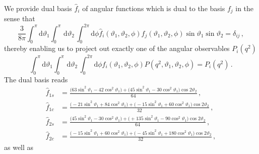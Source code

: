 \documentclass[aps,prd,reprint,nofootinbib,preprintnumbers]{revtex4}
\newcommand{\dd}{\text{d}}
\renewcommand{\theta}{\vartheta}
\begin{document}
We provide dual basis $\hat{f}_i$ of angular functions which is dual to the basis $f_j$ in the sense that
\begin{equation}
    \frac{3}{8\pi}\int_0^\pi \dd\theta_1 \int_0^\pi\,\dd\theta_2\, \int_0^{2\pi}\dd \phi \hat{f}_i(\theta_1,\theta_2,\phi) f_j(\theta_1,\theta_2,\phi) \sin\theta_1 \sin\theta_2 = \delta_{ij}\,,
\end{equation}
thereby enabling us to project out exactly one of the angular
observables $P_i(q^2)$
\begin{equation}
    \int_0^\pi \dd\theta_1 \int_0^\pi\,\dd\theta_2\, \int_0^{2\pi}\dd \phi \hat{f}_i(\theta_1,\theta_2,\phi) P(q^2, \theta_1,\theta_2,\phi) = P_i(q^2)\,.
\end{equation}
The dual basis reads
\begin{equation}
\begin{aligned}
    \hat{f}_{1s} & = \frac{\big( 63 \sin^2\theta_1 - 42 \cos^2\theta_1\big) + \big(  45 \sin^2\theta_1 - 30 \cos^2\theta_1\big)\cos 2\theta_2}{64} \,,\\
    \hat{f}_{1c} & = \frac{\big(-21 \sin^2\theta_1 + 84 \cos^2\theta_1\big) + \big( -15 \sin^2\theta_1 + 60 \cos^2\theta_1\big)\cos 2\theta_2}{32} \,,\\
    \hat{f}_{2s} & = \frac{\big( 45 \sin^2\theta_1 - 30 \cos^2\theta_1\big) + \big(+135 \sin^2\theta_1 - 90 \cos^2\theta_1\big)\cos 2\theta_2}{64} \,,\\
    \hat{f}_{2c} & = \frac{\big(-15 \sin^2\theta_1 + 60 \cos^2\theta_1\big) + \big( -45 \sin^2\theta_1 +180 \cos^2\theta_1\big)\cos 2\theta_2}{32} \,,
\end{aligned}
\end{equation}
as well as
\end{document}
